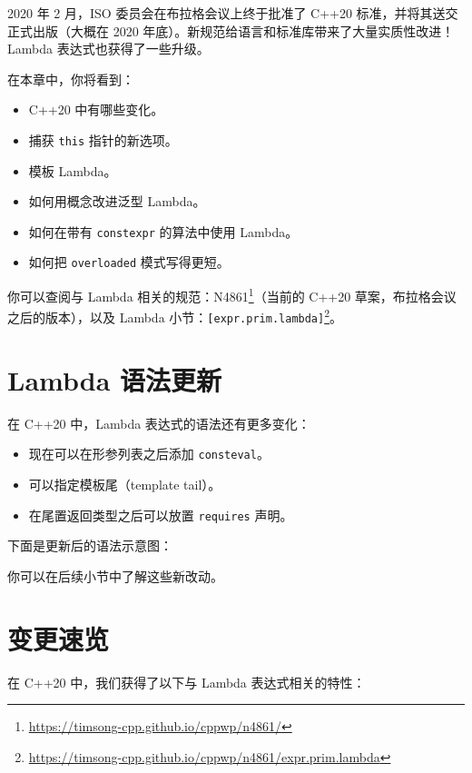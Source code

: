 2020 年 2 月，ISO 委员会在布拉格会议上终于批准了 C++20 标准，并将其送交正式出版（大概在 2020 年底）。新规范给语言和标准库带来了大量实质性改进！Lambda 表达式也获得了一些升级。

在本章中，你将看到：

\begin{itemize}
\item C++20 中有哪些变化。
\item 捕获 \texttt{this} 指针的新选项。
\item 模板 Lambda。
\item 如何用概念改进泛型 Lambda。
\item 如何在带有 \texttt{constexpr} 的算法中使用 Lambda。
\item 如何把 \texttt{overloaded} 模式写得更短。
\end{itemize}

你可以查阅与 Lambda 相关的规范：N4861\footnote{\url{https://timsong-cpp.github.io/cppwp/n4861/}}（当前的 C++20 草案，布拉格会议之后的版本），以及 Lambda 小节：\texttt{[expr.prim.lambda]}\footnote{\url{https://timsong-cpp.github.io/cppwp/n4861/expr.prim.lambda}}。

\section{Lambda 语法更新}

在 C++20 中，Lambda 表达式的语法还有更多变化：

\begin{itemize}
\item 现在可以在形参列表之后添加 \texttt{consteval}。
\item 可以指定模板尾（template tail）。
\item 在尾置返回类型之后可以放置 \texttt{requires} 声明。
\end{itemize}

下面是更新后的语法示意图：


你可以在后续小节中了解这些新改动。

\section{变更速览}

在 C++20 中，我们获得了以下与 Lambda 表达式相关的特性：

